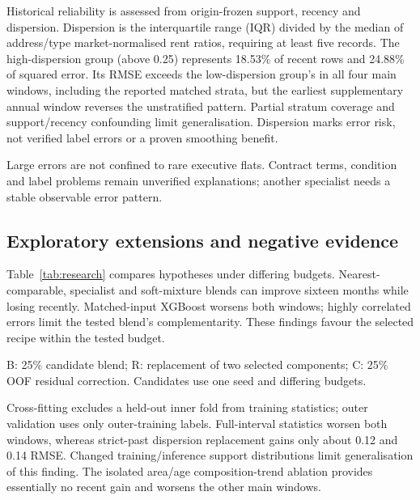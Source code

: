 \documentclass[conference]{IEEEtran}
\begin{document}
Historical reliability is assessed from origin-frozen support, recency and dispersion. Dispersion is the interquartile range (IQR) divided by the median of address/type market-normalised rent ratios, requiring at least five records. The high-dispersion group (above 0.25) represents 18.53\% of recent rows and 24.88\% of squared error. Its RMSE exceeds the low-dispersion group's in all four main windows, including the reported matched strata, but the earliest supplementary annual window reverses the unstratified pattern. Partial stratum coverage and support/recency confounding limit generalisation. Dispersion marks error risk, not verified label errors or a proven smoothing benefit.

Large errors are not confined to rare executive flats. Contract terms, condition and label problems remain unverified explanations; another specialist needs a stable observable error pattern.

\subsection{Exploratory extensions and negative evidence}\label{sec:extensions}
Table~\ref{tab:research} compares hypotheses under differing budgets. Nearest-comparable, specialist and soft-mixture blends can improve sixteen months while losing recently. Matched-input XGBoost worsens both windows; highly correlated errors limit the tested blend's complementarity. These findings favour the selected recipe within the tested budget.

\begin{table}[!tb]
\caption{Exploratory candidate comparisons: RMSE (SGD).}
\label{tab:research}\centering\footnotesize
\par\smallskip\raggedright\footnotesize B: 25\% candidate blend; R: replacement of two selected components; C: 25\% OOF residual correction. Candidates use one seed and differing budgets.
\end{table}
Cross-fitting excludes a held-out inner fold from training statistics; outer validation uses only outer-training labels. Full-interval statistics worsen both windows, whereas strict-past dispersion replacement gains only about 0.12 and 0.14 RMSE. Changed training/inference support distributions limit generalisation of this finding. The isolated area/age composition-trend ablation provides essentially no recent gain and worsens the other main windows.
\end{document}
